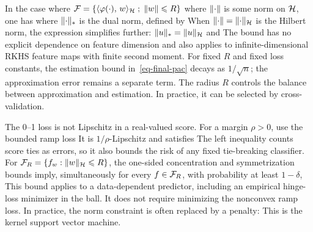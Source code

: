\begin{exmp}
	In the case where $\mathcal{F} = \left\{  \langle \varphi(\cdot),\,w\rangle_{\mathcal{H}}  \;;\;  \lVert w\rVert \leqslant R \right\}$
	where $\lVert\cdot\rVert$ is some norm on $\mathcal{H}$, one has
	where $\lVert\cdot\rVert_*$ is the dual norm, defined by
	When $\lVert\cdot\rVert=\lVert\cdot\rVert_{\mathcal{H}}$ is the Hilbert norm, the expression simplifies further:
	$\lVert u\rVert_* = \lVert u\rVert_{\mathcal{H}}$ and
	The bound has no explicit dependence on feature dimension and also applies to infinite-dimensional RKHS feature maps with finite second moment.
	For fixed $R$ and fixed loss constants, the estimation bound in~\eqref{eq-final-pac} decays as $1/\sqrt{n}$; the approximation error remains a separate term.
	The radius $R$ controls the balance between approximation and estimation. In practice, it can be selected by cross-validation.
\end{exmp}

\begin{exmp}
The 0--1 loss is not Lipschitz in a real-valued score. For a margin $\rho>0$, use the bounded ramp loss
It is $1/\rho$-Lipschitz and satisfies
\eq{1_{[0,+\infty)}(s)\leq\Gamma_\rho(s)\leq\max\{1+s/\rho,0\}.}
The left inequality counts score ties as errors, so it also bounds the risk of any fixed tie-breaking classifier. For $\mathcal{F}_R=\{f_w:\lVert w\rVert_{\mathcal{H}}\leqslant R\}$, the one-sided concentration and symmetrization bounds imply, simultaneously for every $f\in\mathcal{F}_R$, with probability at least $1-\delta$,
This bound applies to a data-dependent predictor, including an empirical hinge-loss minimizer in the ball. It does not require minimizing the nonconvex ramp loss. In practice, the norm constraint is often replaced by a penalty:
This is the kernel support vector machine.
\end{exmp}

